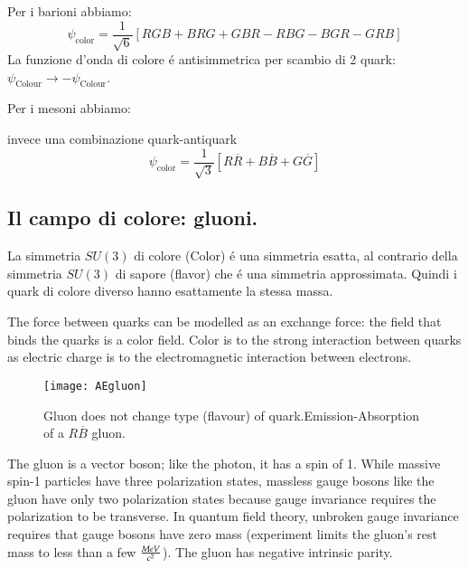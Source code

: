 \documentclass[main.tex]{subfiles}
\begin{document}
Per i barioni abbiamo:
\begin{equation*}
\psi_{\text{color}}=\frac{1}{\sqrt{6}}[RGB+BRG+GBR-RBG-BGR-GRB]
\end{equation*}
La funzione d'onda di colore \'e antisimmetrica per scambio di 2 quark: $\psi_{\text{Colour}}\rightarrow-\psi_{\text{Colour}}$.

Per i mesoni abbiamo:

invece una combinazione quark-antiquark
\begin{equation*}
\psi_{\text{color}}=\frac{1}{\sqrt{3}}[R\overline{R}+B\overline{B}+G\overline{G}]
\end{equation*}

\subsection{Il campo di colore: gluoni.}

La simmetria $SU(3)$ di colore (Color) \'e una simmetria esatta, al contrario della simmetria $SU(3)$ di sapore (flavor) che \'e una simmetria approssimata. Quindi i quark di colore diverso hanno esattamente la stessa massa.

The force between quarks can be modelled as an exchange force: the field that binds the quarks is a color field. Color is to the strong interaction between quarks as electric charge is to the electromagnetic interaction between electrons.

\begin{figure}[!ht]
\centering
\texttt{[image: AEgluon]}
\caption{Gluon does not change type (flavour) of quark.Emission-Absorption of a $R\overline{B}$ gluon.}
\label{fig:AEgluon}
\end{figure}



The gluon is a vector boson; like the photon, it has a spin of 1. While massive spin-1 particles have three polarization states, massless gauge bosons like the gluon have only two polarization states because gauge invariance requires the polarization to be transverse. In quantum field theory, unbroken gauge invariance requires that gauge bosons have zero mass (experiment limits the gluon's rest mass to less than a few $\frac{MeV}{c^2}$). The gluon has negative intrinsic parity.
\end{document}
